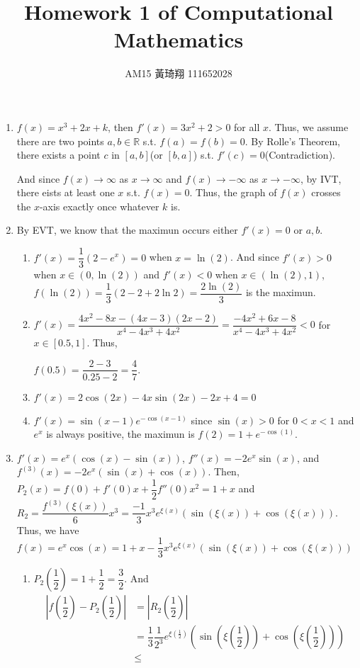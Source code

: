 \documentclass[12pt]{article}
\title{Homework 1 of Computational Mathematics}
\author{AM15 黃琦翔 111652028}
\begin{document}
\maketitle
\begin{enumerate}
    \item $f(x) = x^3 + 2x + k$, then $f'(x) = 3x^2 + 2 > 0$ for all $x$.
    Thus, we assume there are two points $a, b \in \mathbb{R}$ s.t. $f(a) = f(b) = 0$.
    By Rolle's Theorem, there exists a point $c$ in $[a, b]$(or $[b, a]$) s.t. $f'(c) = 0$(Contradiction).

    And since $f(x) \to \infty$ as $x \to \infty$ and $f(x) \to -\infty$ as $x\to -\infty$,
    by IVT, there eists at least one $x$ s.t. $f(x) = 0$.
    Thus, the graph of $f(x)$ crosses the $x$-axis exactly once whatever $k$ is.

    \item By EVT, we know that the maximun occurs either $f'(x) = 0$ or $a, b$.\begin{enumerate}
        \item $f'(x) = \dfrac{1}{3}(2 - e^{x}) = 0$ when $x = \ln(2)$.
        And since $f'(x) > 0$ when $x \in (0, \ln(2))$ and $f'(x) < 0$ when $x\in (\ln(2), 1)$,
        $f(\ln(2)) = \dfrac{1}{3}(2-2+2\ln2) = \dfrac{2\ln(2)}{3}$ is the maximun.

        \item $f'(x) = \dfrac{4x^2 - 8x - (4x-3)(2x-2)}{x^4 - 4x^3 + 4x^2} = \dfrac{-4x^2 + 6x - 8}{x^4 - 4x^3 + 4x^2} < 0$ for $x \in [0.5, 1]$.
        Thus, 
        
        $f(0.5) = \dfrac{2-3}{0.25-2} = \dfrac{4}{7}$.

        \item $f'(x) = 2\cos(2x) - 4x\sin(2x) - 2x + 4 = 0$

        \item $f'(x) = \sin(x-1)e^{-\cos(x-1)}$ since $\sin(x) > 0$ for $0 < x < 1$ and $e^{x}$ is always positive, 
        the maximun is $f(2) = 1 + e^{-\cos(1)}$.
    \end{enumerate}

        \item $f'(x) = e^x(\cos(x) - \sin(x))$, $f''(x) = -2e^x\sin(x)$, and $f^{(3)}(x) = -2e^x(\sin(x) + \cos(x))$. 
        Then, $P_2(x) = f(0) + f'(0)x + \dfrac{1}{2} f''(0)x^2 = 1 + x$ and $R_2 = \dfrac{f^{(3)}(\xi(x))}{6}x^3 = \dfrac{-1}{3}x^3e^{\xi(x)}(\sin(\xi(x)) + \cos(\xi(x)))$.
        Thus, we have $f(x) = e^x\cos(x) = 1 + x - \dfrac{1}{3}x^3e^{\xi(x)}(\sin(\xi(x)) + \cos(\xi(x)))$
    \begin{enumerate}
        \item $P_2(\dfrac{1}{2}) = 1 + \dfrac{1}{2} = \dfrac{3}{2}$. And \begin{align*}
            |f(\dfrac{1}{2}) - P_2(\dfrac{1}{2})| &= |R_2(\dfrac{1}{2})|\\
            &= \dfrac{1}{3} \dfrac{1}{2^3} e^{\xi(\frac{1}{2})}(\sin(\xi(\dfrac{1}{2})) + \cos(\xi(\dfrac{1}{2})))\\
            &\leq 
        \end{align*}
    \end{enumerate}
\end{enumerate}
\end{document}
